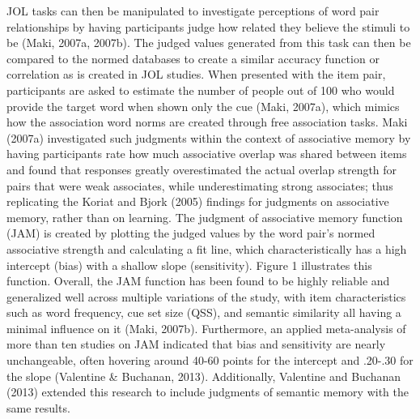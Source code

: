 \documentclass[english,man]{apa6}
\theoremstyle{definition}
\theoremstyle{definition}
\theoremstyle{remark}
\begin{document}
JOL tasks can then be manipulated to investigate perceptions of word
pair relationships by having participants judge how related they believe
the stimuli to be (Maki, 2007a, 2007b). The judged values generated from
this task can then be compared to the normed databases to create a
similar accuracy function or correlation as is created in JOL studies.
When presented with the item pair, participants are asked to estimate
the number of people out of 100 who would provide the target word when
shown only the cue (Maki, 2007a), which mimics how the association word
norms are created through free association tasks. Maki (2007a)
investigated such judgments within the context of associative memory by
having participants rate how much associative overlap was shared between
items and found that responses greatly overestimated the actual overlap
strength for pairs that were weak associates, while underestimating
strong associates; thus replicating the Koriat and Bjork (2005) findings
for judgments on associative memory, rather than on learning. The
judgment of associative memory function (JAM) is created by plotting the
judged values by the word pair's normed associative strength and
calculating a fit line, which characteristically has a high intercept
(bias) with a shallow slope (sensitivity). Figure 1 illustrates this
function. Overall, the JAM function has been found to be highly reliable
and generalized well across multiple variations of the study, with item
characteristics such as word frequency, cue set size (QSS), and semantic
similarity all having a minimal influence on it (Maki, 2007b).
Furthermore, an applied meta-analysis of more than ten studies on JAM
indicated that bias and sensitivity are nearly unchangeable, often
hovering around 40-60 points for the intercept and .20-.30 for the slope
(Valentine \& Buchanan, 2013). Additionally, Valentine and Buchanan
(2013) extended this research to include judgments of semantic memory
with the same results.
\end{document}
